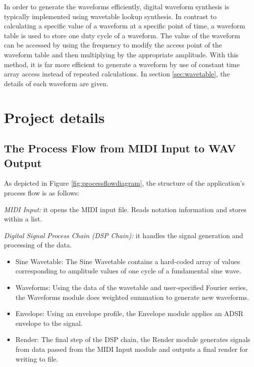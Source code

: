 \documentclass[runningheads]{llncs}
\begin{document}
In order to generate the waveforms efficiently, digital waveform synthesis is typically implemented using wavetable lookup synthesis. 
In contrast to calculating a specific value of a waveform at a specific point of time, a waveform table is used to store one duty cycle of a waveform. The value of the waveform can be accessed by using the frequency to modify the access point of the waveform table and then multiplying by the appropriate amplitude. With this method, it is far more efficient to generate a waveform by use of constant time array access instead of repeated calculations. In section \ref{sec:wavetable}, the details of each waveform are given.

\section{Project details} \label{sec:project}

\subsection{The Process Flow from MIDI Input to WAV Output}
\label{sec:processflow}
As depicted in Figure \ref{fig:processflowdiagram}, the structure of the application's process flow is as follows:

\noindent \textit{MIDI Input:} 
        it opens the MIDI input file.
        Reads notation information and stores within a list.
        
\noindent \textit{Digital Signal Process Chain (DSP Chain):}
        it handles the signal generation and processing of the data.
        \begin{itemize}
            \item Sine Wavetable:
                The Sine Wavetable contains a hard-coded array of values corresponding to amplitude values of one cycle of a fundamental sine wave.
            \item Waveforms:
                Using the data of the wavetable and user-specified Fourier series, the Waveforms module does weighted summation to generate new waveforms.
            \item Envelope:
                Using an envelope profile, the Envelope module applies an ADSR envelope to the signal.
            \item Render:
                The final step of the DSP chain, the Render module generates signals from data passed from the MIDI Input module and outputs a final render for writing to file.
        \end{itemize}
\end{document}
